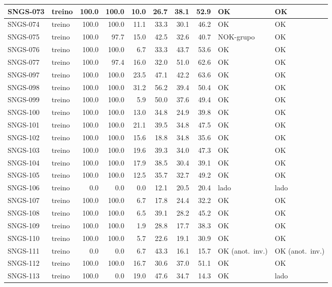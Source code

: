 \begin{small}
\begin{longtable}{|l|l|r|r|r|r|r|r|l|l|}
SNGS-073 & treino & 100.0 & 100.0 & 10.0 & 26.7 & 38.1 & 52.9 & OK & OK \\ \hline
SNGS-074 & treino & 100.0 & 100.0 & 11.1 & 33.3 & 30.1 & 46.2 & OK & OK \\ \hline
SNGS-075 & treino & 100.0 & 97.7 & 15.0 & 42.5 & 32.6 & 40.7 & NOK-grupo & OK \\ \hline
SNGS-076 & treino & 100.0 & 100.0 & 6.7 & 33.3 & 43.7 & 53.6 & OK & OK \\ \hline
SNGS-077 & treino & 100.0 & 97.4 & 16.0 & 32.0 & 51.0 & 62.6 & OK & OK \\ \hline
SNGS-097 & treino & 100.0 & 100.0 & 23.5 & 47.1 & 42.2 & 63.6 & OK & OK \\ \hline
SNGS-098 & treino & 100.0 & 100.0 & 31.2 & 56.2 & 39.4 & 50.4 & OK & OK \\ \hline
SNGS-099 & treino & 100.0 & 100.0 & 5.9 & 50.0 & 37.6 & 49.4 & OK & OK \\ \hline
SNGS-100 & treino & 100.0 & 100.0 & 13.0 & 34.8 & 24.9 & 39.8 & OK & OK \\ \hline
SNGS-101 & treino & 100.0 & 100.0 & 21.1 & 39.5 & 34.8 & 47.5 & OK & OK \\ \hline
SNGS-102 & treino & 100.0 & 100.0 & 15.6 & 18.8 & 34.8 & 35.6 & OK & OK \\ \hline
SNGS-103 & treino & 100.0 & 100.0 & 19.6 & 39.3 & 34.0 & 47.3 & OK & OK \\ \hline
SNGS-104 & treino & 100.0 & 100.0 & 17.9 & 38.5 & 30.4 & 39.1 & OK & OK \\ \hline
SNGS-105 & treino & 100.0 & 100.0 & 12.5 & 35.7 & 32.7 & 49.2 & OK & OK \\ \hline
SNGS-106 & treino & 0.0 & 0.0 & 0.0 & 12.1 & 20.5 & 20.4 & lado & lado \\ \hline
SNGS-107 & treino & 100.0 & 100.0 & 6.7 & 17.8 & 24.4 & 32.2 & OK & OK \\ \hline
SNGS-108 & treino & 100.0 & 100.0 & 6.5 & 39.1 & 28.2 & 45.2 & OK & OK \\ \hline
SNGS-109 & treino & 100.0 & 100.0 & 1.9 & 28.8 & 17.7 & 38.3 & OK & OK \\ \hline
SNGS-110 & treino & 100.0 & 100.0 & 5.7 & 22.6 & 19.1 & 30.9 & OK & OK \\ \hline
SNGS-111 & treino & 0.0 & 0.0 & 6.7 & 43.3 & 16.1 & 15.7 & OK (anot.\ inv.) & OK (anot.\ inv.) \\ \hline
SNGS-112 & treino & 100.0 & 100.0 & 16.7 & 30.6 & 37.0 & 51.1 & OK & OK \\ \hline
SNGS-113 & treino & 100.0 & 0.0 & 19.0 & 47.6 & 34.7 & 14.3 & OK & lado \\ \hline

\end{longtable}
\end{small}
